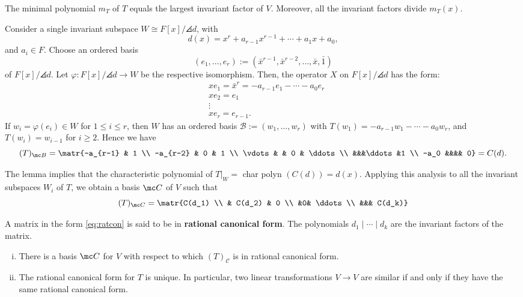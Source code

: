 \begin{prop}
    The minimal polynomial $m_T$ of $T$ equals the largest invariant factor of $V$. Moreover, all the invariant factors divide $m_T(x)$.
\end{prop}

Consider a single invariant subspace $W \cong F[x] / \angles d$, with
$$d(x) = x^r  + a_{r-1}x^{r-1}+\cdots  +a_1x + a_0,$$
and $a_i \in F$. Choose an ordered basis
$$(e_1,\dots,e_r) := ( \bar x^{r-1},\bar x^{r-2},\dots,\bar x,\bar 1)$$
of $F[x] / \angles d$. Let $\varphi : F[x] /\angles d \to W$ be the respective isomorphism. Then, the operator $X$ on $F[x]/ \angles d$ has the form:
\begin{align*}
    &xe_1 = \bar x ^r = -a_{r-1}e_1 - \cdots - a_0e_r \\ &xe_2 = e_1 \\ &\vdots \\ &x e_r = e_{r-1}.
\end{align*}
If $w_i = \varphi (e_i) \in W$ for $1 \leq i \leq r$, then $W$ has an ordered basis $\mathcal B := (w_1,\dots,w_r)$ with $T(w_1) = -a_{r-1}w_1 - \cdots - a_0w_r$, and $T(w_i) = w_{i-1}$ for $i \geq 2$. Hence we have
$$(T)_{\mc B} = \matr{-a_{r-1} & 1 \\ -a_{r-2} & 0 & 1 \\ \vdots & & 0 & \ddots \\ &&&\ddots&1 \\ -a_0 &&&& 0}=C(d).$$

The lemma implies that the characteristic polynomial of $T|_W =$ char polyn $(C(d)) = d(x)$. Applying this analysis to all the invariant subspaces $W_i$ of $T$, we obtain a basis $\mc C$ of $V$ such that
\begin{equation} \label{eq:ratcon}
    (T)_{\mc C} = \matr{C(d_1)  \\  & C(d_2) & 0 \\ &0& \ddots \\ &&& C(d_k)}
\end{equation}

\begin{defn}
    A matrix in the form \eqref{eq:ratcon} is said to be in \textbf{rational canonical form}. The polynomials $d_1\mid \cdots\mid d_k$ are the invariant factors of the matrix.
\end{defn}

\begin{thm}
    \begin{enumerate}[(i)]
        \item There is a basis $\mc C$ for $V$ with respect to which $(T)_{\mathcal C}$ is in rational canonical form.
        \item The rational canonical form for $T$ is unique. In particular, two linear transformations $V \to V$ are similar if and only if they have the same rational canonical form.
    \end{enumerate}
\end{thm}

